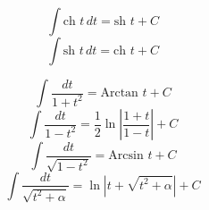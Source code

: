 \begin{frame}
$$\int \text{ch } t \, dt = \text{sh } t +C$$
\pause
$$\int \text{sh } t \, dt = \text{ch } t +C$$
\end{frame}

\begin{frame}
$$\int \frac{dt}{1+t^2} = \text{Arctan }t+C$$
\pause
$$\int \frac{dt}{1-t^2} = \frac{1}{2}\ln \left| \frac{1+t}{1-t} \right| +C$$
\pause
$$\int \frac{dt}{\sqrt{1-t^2}} = \text{Arcsin }t+C$$
\pause
$$\int \frac{dt}{\sqrt{t^2+\alpha}} = \ln \left| t+\sqrt{t^2+\alpha} \right| +C$$
\end{frame}



